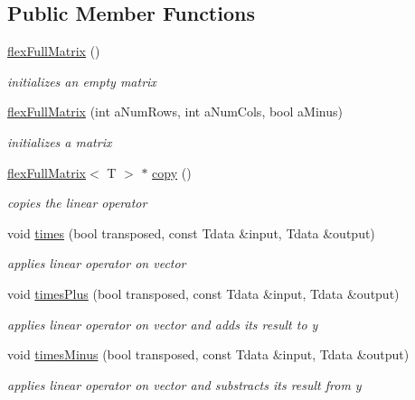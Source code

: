 \subsection*{Public Member Functions}
\begin{DoxyCompactItemize}
\item 
\mbox{\label{classflex_full_matrix_a125feeded467ace162fc6b1002df6ef2}} 
\hyperlink{classflex_full_matrix_a125feeded467ace162fc6b1002df6ef2}{flex\+Full\+Matrix} ()
\begin{DoxyCompactList}\small\item\em initializes an empty matrix \end{DoxyCompactList}\item 
\hyperlink{classflex_full_matrix_a1523d991180fa00de2db44b10231987b}{flex\+Full\+Matrix} (int a\+Num\+Rows, int a\+Num\+Cols, bool a\+Minus)
\begin{DoxyCompactList}\small\item\em initializes a matrix \end{DoxyCompactList}\item 
\hyperlink{classflex_full_matrix}{flex\+Full\+Matrix}$<$ T $>$ $\ast$ \hyperlink{classflex_full_matrix_a849d2974a11456c6a23801f51838bc7b}{copy} ()
\begin{DoxyCompactList}\small\item\em copies the linear operator \end{DoxyCompactList}\item 
void \hyperlink{classflex_full_matrix_ad5c9cc8d3618cba2f96c963a6d180224}{times} (bool transposed, const Tdata \&input, Tdata \&output)
\begin{DoxyCompactList}\small\item\em applies linear operator on vector \end{DoxyCompactList}\item 
void \hyperlink{classflex_full_matrix_a5c5dc25704d934e28dd6944bbe4b3496}{times\+Plus} (bool transposed, const Tdata \&input, Tdata \&output)
\begin{DoxyCompactList}\small\item\em applies linear operator on vector and adds its result to y \end{DoxyCompactList}\item 
void \hyperlink{classflex_full_matrix_adf676d913b1409d6792fcd6cce144285}{times\+Minus} (bool transposed, const Tdata \&input, Tdata \&output)
\begin{DoxyCompactList}\small\item\em applies linear operator on vector and substracts its result from y \end{DoxyCompactList}\item 

\end{DoxyCompactItemize}
